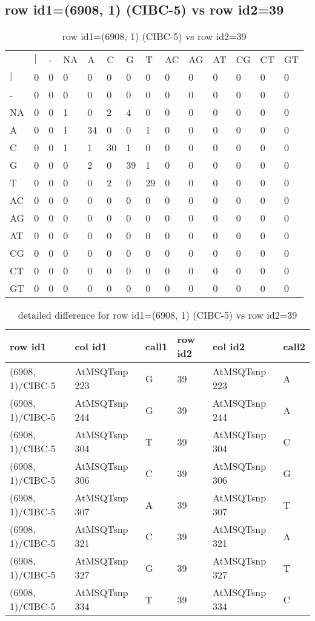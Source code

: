 \subsection{row id1=(6908, 1) (CIBC-5) vs row id2=39}
\begin{center}
\begin{longtable}{|l|l|l|l|l|l|l|l|l|l|l|l|l|l|}
\caption{row id1=(6908, 1) (CIBC-5) vs row id2=39} \label{table_dm82}\\
\hline
\\
\hline
&$|$&-&NA&A&C&G&T&AC&AG&AT&CG&CT&GT\\
$|$&0&0&0&0&0&0&0&0&0&0&0&0&0\\
-&0&0&0&0&0&0&0&0&0&0&0&0&0\\
NA&0&0&1&0&2&4&0&0&0&0&0&0&0\\
A&0&0&1&34&0&0&1&0&0&0&0&0&0\\
C&0&0&1&1&30&1&0&0&0&0&0&0&0\\
G&0&0&0&2&0&39&1&0&0&0&0&0&0\\
T&0&0&0&0&2&0&29&0&0&0&0&0&0\\
AC&0&0&0&0&0&0&0&0&0&0&0&0&0\\
AG&0&0&0&0&0&0&0&0&0&0&0&0&0\\
AT&0&0&0&0&0&0&0&0&0&0&0&0&0\\
CG&0&0&0&0&0&0&0&0&0&0&0&0&0\\
CT&0&0&0&0&0&0&0&0&0&0&0&0&0\\
GT&0&0&0&0&0&0&0&0&0&0&0&0&0\\
\hline
\end{longtable}
\end{center}

\begin{center}
\begin{longtable}{|l|l|l|l|l|l|}
\caption{detailed difference for row id1=(6908, 1) (CIBC-5) vs row id2=39} \label{table_dm83}\\
\hline
row id1&col id1&call1&row id2&col id2&call2\\
\hline
(6908, 1)/CIBC-5&AtMSQTsnp 223&G&39&AtMSQTsnp 223&A\\
(6908, 1)/CIBC-5&AtMSQTsnp 244&G&39&AtMSQTsnp 244&A\\
(6908, 1)/CIBC-5&AtMSQTsnp 304&T&39&AtMSQTsnp 304&C\\
(6908, 1)/CIBC-5&AtMSQTsnp 306&C&39&AtMSQTsnp 306&G\\
(6908, 1)/CIBC-5&AtMSQTsnp 307&A&39&AtMSQTsnp 307&T\\
(6908, 1)/CIBC-5&AtMSQTsnp 321&C&39&AtMSQTsnp 321&A\\
(6908, 1)/CIBC-5&AtMSQTsnp 327&G&39&AtMSQTsnp 327&T\\
(6908, 1)/CIBC-5&AtMSQTsnp 334&T&39&AtMSQTsnp 334&C\\
\hline
\end{longtable}
\end{center}

